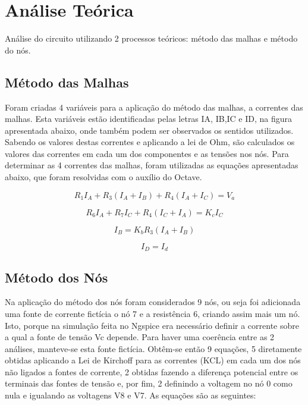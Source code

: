 \section{Análise Teórica}
\label{sec:analise_teorica}
Análise do circuito utilizando 2 processos teóricos: método das malhas e método do nós.
\subsection{Método das Malhas} 

Foram criadas 4 variáveis para a aplicação do método das malhas, a correntes das malhas. Esta variáveis estão identificadas pelas letras IA, IB,IC e ID, na figura apresentada abaixo, onde também podem ser observados os sentidos utilizados. Sabendo os valores destas correntes e aplicando a lei de Ohm, são calculados os valores das correntes em cada um dos componentes e as tensões nos nós. Para determinar as 4 correntes das malhas, foram utilizadas as equações apresentadas abaixo, que foram resolvidas com o auxílio do Octave. 

\begin {equation}
	R_1I_A + R_3(I_A+I_B) + R_4(I_A+I_C) = V_a
	\label{eq:malha1}
\end{equation}

\begin {equation}
	R_6I_A + R_7I_C + R_4(I_C+I_A) = K_cI_C
	\label{eq:malha2}
\end{equation}

\begin {equation}
	I_B = K_bR_3(I_A+I_B)
	\label{eq:malha3}
\end{equation}

\begin {equation}
	I_D = I_d
	\label{eq:malha4}
\end{equation}


\subsection{Método dos Nós} 

Na aplicação do método dos nós foram considerados 9 nós, ou seja foi adicionada uma fonte de corrente fictícia o nó 7 e a resistência 6, criando assim mais um nó. Isto, porque na simulação feita no Ngspice era necessário definir a corrente sobre a qual a fonte de tensão Vc depende. Para haver uma coerência entre as 2 análises, manteve-se esta fonte fictícia. Obtêm-se então 9 equações, 5 diretamente obtidas aplicando a Lei de Kirchoff para as correntes (KCL) em cada um dos nós não ligados a fontes de corrente, 2 obtidas fazendo a diferença potencial entre os terminais das fontes de tensão e, por fim, 2 definindo a voltagem no nó 0 como nula e igualando as voltagens V8 e V7. As equações são as seguintes:\par


